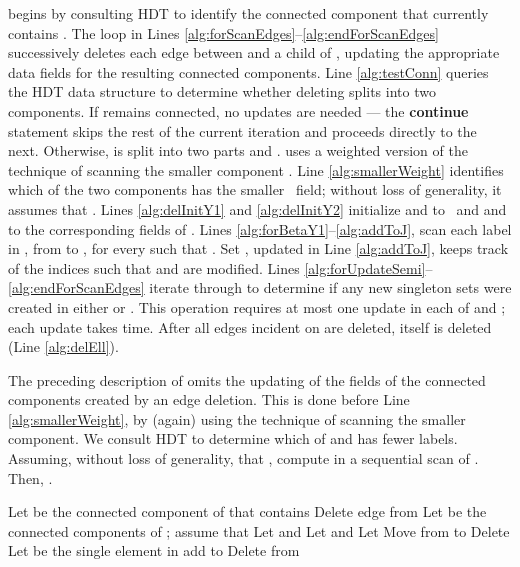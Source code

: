 \documentclass[11pt]{article}
\theoremstyle{definition}
\begin{document}
 begins by consulting HDT to identify the connected component  that currently contains .  The loop in Lines \ref{alg:forScanEdges}--\ref{alg:endForScanEdges} successively deletes each edge between  and a child  of , updating the appropriate data fields for the resulting connected components.  Line \ref{alg:testConn} queries the HDT data structure to determine whether deleting  splits  into two components. If  remains connected, no updates are needed --- the \textbf{continue} statement skips the rest of the current iteration and proceeds directly to the next.  Otherwise,  is split into two parts  and .   uses a weighted version of the technique of scanning the smaller component \cite{EvenShiloach:1981}.  Line \ref{alg:smallerWeight} identifies which of the two components has the smaller \WEIGHT\ field; without loss of generality, it assumes that .  Lines \ref{alg:delInitY1} and \ref{alg:delInitY2} initialize  and  to \NULL\ and  and  to the corresponding fields of .   Lines \ref{alg:forBetaY1}--\ref{alg:addToJ}, scan each label  in , from  to , for every  such that .
Set , updated in Line \ref{alg:addToJ}, keeps track of the indices  such that  and  are modified.  Lines \ref{alg:forUpdateSemi}--\ref{alg:endForScanEdges} iterate through  to determine if any new singleton sets were created in either  or .  
This operation requires at most one update in each of  and ; each update takes  time.   After all edges incident on  are deleted,  itself is deleted (Line \ref{alg:delEll}).

The preceding description of  omits the updating of the  fields of the connected components created by an edge deletion. This is done before Line \ref{alg:smallerWeight}, by (again) using the technique of scanning the smaller component.  We consult HDT to determine which of  and  has fewer labels.  Assuming, without loss of generality, that , compute  in a sequential scan of .  Then, .


\begin{algorithm}[t]
\SetAlgoLined\SetNoFillComment

\DontPrintSemicolon
Let  be the connected component of  that contains  \label{alg:findY}\;
	\ForEach {\label{alg:forScanEdges}}
	{
Delete edge  from  \label{alg:deleteEdge}\;
		Let  be the connected components of ; assume that  \label{alg:smallerWeight} \;
		Let  and  \label{alg:delInitY1}\;
		Let  and  \label{alg:delInitY2}\;
		Let  \;
		\ForEach {\label{alg:forBetaY1}}
		{
			{
Move  from  to  \label{alg:MoveBeta} \;
					 \label{alg:addToJ}
}
		}
		\ForEach {\label{alg:forUpdateSemi}}
		{
			\ForEach{}
			{
				\If{}
				{
					Delete 
				}
				{
					Let  be the single element in  \;
					 \;
					\lIf{}
					{
						add  to  \label{alg:endForScanEdges}
					}
				}
			}
		}
	}
	Delete  from  \label{alg:delEll}
\caption{}\label{alg:delLabel}
\end{algorithm}
\end{document}
